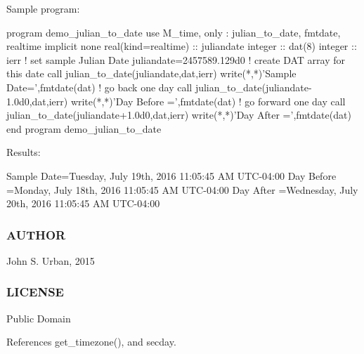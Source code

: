 \begin{DoxyVerb} Sample program:

  program demo_julian_to_date
  use M_time, only : julian_to_date, fmtdate, realtime
  implicit none
  real(kind=realtime)     :: juliandate
  integer                 :: dat(8)
  integer                 :: ierr
     ! set sample Julian Date
     juliandate=2457589.129d0
     ! create DAT array for this date
     call julian_to_date(juliandate,dat,ierr)
     write(*,*)'Sample Date=',fmtdate(dat)
     ! go back one day
     call julian_to_date(juliandate-1.0d0,dat,ierr)
     write(*,*)'Day Before =',fmtdate(dat)
     ! go forward one day
     call julian_to_date(juliandate+1.0d0,dat,ierr)
     write(*,*)'Day After  =',fmtdate(dat)
  end program demo_julian_to_date

 Results:

  Sample Date=Tuesday, July 19th, 2016 11:05:45 AM UTC-04:00
  Day Before =Monday, July 18th, 2016 11:05:45 AM UTC-04:00
  Day After  =Wednesday, July 20th, 2016 11:05:45 AM UTC-04:00
\end{DoxyVerb}


\subsubsection*{A\+U\+T\+H\+OR}

John S. Urban, 2015 \subsubsection*{L\+I\+C\+E\+N\+SE}

Public Domain 

References get\+\_\+timezone(), and secday.

